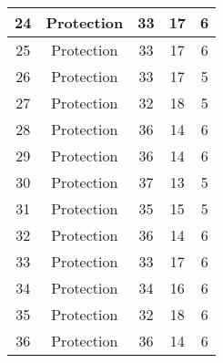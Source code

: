 \documentclass[results.tex]{subfiles}
\begin{document}
\begin{center}
\begin{tabular}{| c || c | c | c | c |}
            \hline
            24                      & Protection                   & 33                     & 17                      & 6                    \\
            \hline
            25                      & Protection                   & 33                     & 17                      & 6                    \\
            \hline
            26                      & Protection                   & 33                     & 17                      & 5                    \\
            \hline
            27                      & Protection                   & 32                     & 18                      & 5                    \\
            \hline
            28                      & Protection                   & 36                     & 14                      & 6                    \\
            \hline
            29                      & Protection                   & 36                     & 14                      & 6                    \\
            \hline
            30                      & Protection                   & 37                     & 13                      & 5                    \\
            \hline
            31                      & Protection                   & 35                     & 15                      & 5                    \\
            \hline
            32                      & Protection                   & 36                     & 14                      & 6                    \\
            \hline
            33                      & Protection                   & 33                     & 17                      & 6                    \\
            \hline
            34                      & Protection                   & 34                     & 16                      & 6                    \\
            \hline
            35                      & Protection                   & 32                     & 18                      & 6                    \\
            \hline
            36                      & Protection                   & 36                     & 14                      & 6                    \\

\end{tabular}
\end{center}
\end{document}
